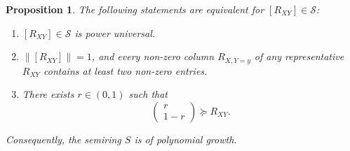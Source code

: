 \documentclass[aps,pra,11pt,onecolumn,nofootinbib,tightenlines]{revtex4-2}
\newtheorem{proposition}[theorem]{Proposition}
\theoremstyle{definition}
\newcommand{\cS}{\mathcal{S}}
\begin{document}
\begin{proposition}
\label{prop: power universals}
The following statements are equivalent for $[R_{XY}] \in \cS$:
\begin{enumerate}
    \item \( [R_{XY}] \in \cS \) is power universal.
    \label{item: power universal}
     \item  \( \|[R_{XY}]\| = 1 \), and every non-zero column \( R_{X,Y=y} \) of any representative \( R_{XY} \) contains at least two non-zero entries.
    \label{item: two non-zero entries}
    \item There exists \( r \in (0,1) \) such that
    \begin{equation}\label{eq:pucond}
    \begin{pmatrix}
        r \\
        1 - r
    \end{pmatrix}
    \succeq R_{XY}.
    \end{equation}
    \label{item: majorization R_r}
\end{enumerate}
Consequently, the semiring $S$ is of polynomial growth.
\end{proposition}
\end{document}
